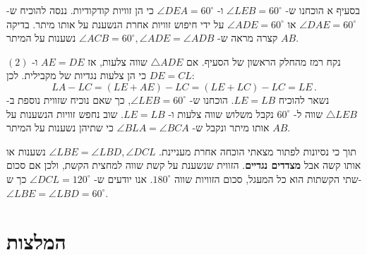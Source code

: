 \documentclass[12pt,a4paper]{article}
\begin{document}
בסעיף א הוכחנו ש-%
$\angle LEB=60^\circ$
ו-%
$\angle DEA=60^\circ$
כי הן זוויות קודקודיות. ננסה להוכיח ש-%
$\angle DAE=60^\circ$
או
$\angle ADE=60^\circ$
על ידי חיפוש זוויות אחרת הנשענת על אותו מיתר. בדיקה קצרה מראה ש-%
$\angle ACB=60^\circ, \angle ADE=\angle ADB$
נשענות על המיתר
$AB$.

$(2)$
נקח רמז מהחלק הראשון של הסעיף. אם
$\triangle ADE$
שווה צלעות, אז
$AE=DE$
ו-%
$DE=CL$
כי הן צלעות נגדיות של מקבילית. לכן:
\[
LA-LC=(LE+AE)-LC=(LE+LC)-LC=LE\,.
\]
נשאר להוכיח
$LE=LB$.
הוכחנו ש-%
$\angle LEB=60^\circ$,
כך שאם נוכיח שזווית נוספת ב-%
$\triangle LEB$
שווה ל-%
$60^\circ$
נקבל משלוש שווה צלעות ו-%
$LE=LB$.
שוב נחפש זוויות הנשענות על אותו מיתר ונקבל ש-%
$\angle BLA=\angle BCA$
כי שתיהן נשענות על המיתר
$AB$.

תוך כי נסיונות לפתור מצאתי הוכחה אחרת מעניינת. 
$\angle LBE=\angle LBD, \angle DCL$
נשענות או אותו קשה אבל
\textbf{מצדדים נגדיים}.
הזווית שנשענת על קשת שווה למחצית הקשת, ולכן אם סכום שתי הקשתות הוא כל המעגל, סכום הזוויות שווה 
$180^\circ$.
אנו יודעים ש-%
$\angle DCL=120^\circ$
כך ש-%
$\angle LBE=\angle LBD=60^\circ$.


\newpage

\section*{המלצות}
\end{document}
